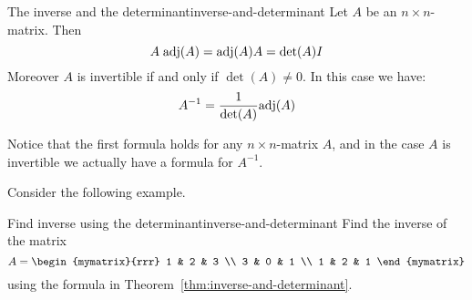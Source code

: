 \begin{theorem}{The inverse and the determinant}{inverse-and-determinant}
  Let $A$ be an $n\times n$-matrix. Then
  \begin{equation*}
    A \; \mbox{\rm adj}(A) = \mbox{\rm adj}(A)A = {\det(A)} I
  \end{equation*}
  Moreover $A$ is invertible if and only if $\det(A) \neq 0$. In this
  case%
   we have:
  \begin{equation*}
    A^{-1} = \frac{1}{\det(A)} \mbox{\rm adj}(A)
  \end{equation*}
\end{theorem}


Notice that the first formula holds for any $n \times n$-matrix $A$,
and in the case $A$ is invertible we actually have a formula for
$A^{-1}$.

Consider the following example.

\begin{example}{Find inverse using the determinant}{inverse-and-determinant}
  Find the inverse of the matrix
  \begin{equation*}
    A=\begin{mymatrix}{rrr}
      1 & 2 & 3 \\
      3 & 0 & 1 \\
      1 & 2 & 1
    \end{mymatrix}
  \end{equation*}
  using the formula in Theorem~\ref{thm:inverse-and-determinant}.
\end{example}

